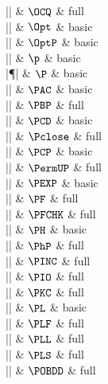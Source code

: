 |\OCQ|    & $\OCQ$ & full \\

|\Opt|    & $\Opt$ & basic \\

|\OptP|    & $\OptP$ & basic \\

|\p|    & $\p$ & basic \\

|\P|    & $\P$ & basic \\

|\PAC|    & $\PAC$ & basic \\

|\PBP|    & $\PBP$ & full \\

|\PCD|    & $\PCD$ & basic \\

|\Pclose|    & $\Pclose$ & full \\

|\PCP|    & $\PCP$ & basic \\

|\PermUP|    & $\PermUP$ & full \\

|\PEXP|    & $\PEXP$ & basic \\

|\PF|    & $\PF$ & full \\

|\PFCHK|    & $\PFCHK$ & full \\

|\PH|    & $\PH$ & basic \\

|\PhP|    & $\PhP$ & full \\

|\PINC|    & $\PINC$ & full \\

|\PIO|    & $\PIO$ & full \\

|\PKC|    & $\PKC$ & full \\

|\PL|    & $\PL$ & basic \\

|\PLF|    & $\PLF$ & full \\

|\PLL|    & $\PLL$ & full \\

|\PLS|    & $\PLS$ & full \\

|\POBDD|    & $\POBDD$ & full \\

